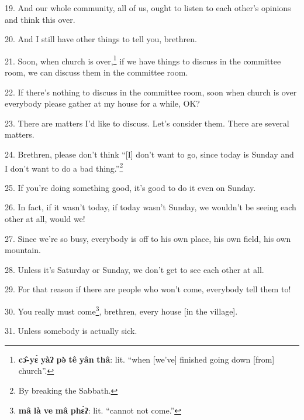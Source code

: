 19. And our whole community, all of us, ought to listen to each other's opinions
and think this over.

20. And I still have other things to tell you, brethren.

21. Soon, when church is over,\footnote{\textbf{cɔ̂-yɛ̀} \textbf{yàʔ} \textbf{pə̀} \textbf{tê} \textbf{yân} \textbf{thâ}: lit. ``when [we've] finished going down [from] church''.} if we have things to discuss in the committee
room, we can discuss them in the committee room.

22. If there's nothing to discuss in the committee room, soon when church is over
everybody please gather at my house for a while, OK?

23. There are matters I'd like to discuss. Let's consider them. There are several
matters.

24. Brethren, please don't think ``[I] don't want to go, since today is Sunday
and I don't want to do a bad thing.''\footnote{By breaking the Sabbath.}

25. If you're doing something good, it's good to do it even on Sunday.

26. In fact, if it wasn't today, if today wasn't Sunday, we wouldn't be seeing
each other at all, would we!

27. Since we're so busy, everybody is off to his own place, his own field, his
own mountain.

28. Unless it's Saturday or Sunday, we don't get to see each other at all.

29. For that reason if there are people who won't come, everybody tell them to!

30. You really must come\footnote{\textbf{mâ} \textbf{là} \textbf{ve} \textbf{mâ} \textbf{phɛ̀ʔ}: lit. ``cannot not come.''}, brethren, every house [in the village].

31. Unless somebody is actually sick.

